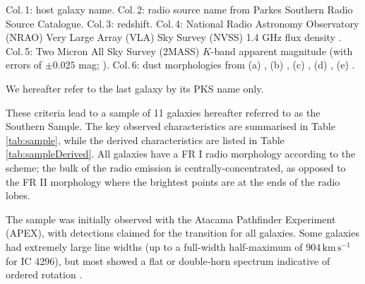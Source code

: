 \begin{table}
\begin{threeparttable}
\begin{tabular}{l l r r r l}
			\hline
		\end{tabular}
		\begin{tablenotes}
		\footnotesize
		\note Col.\,1: host galaxy name. Col.\,2: radio source name from Parkes Southern Radio Source Catalogue. Col.\,3: redshift. Col.\,4: National Radio Astronomy Observatory (NRAO) Very Large Array (VLA) Sky Survey (NVSS) 1.4 GHz flux density \citep{Condon1998}. Col.\,5: Two Micron All Sky Survey (2MASS) $K$-band apparent magnitude (with errors of $\pm 0.025$ mag; \citealt{Skrutskie2006}). Col.\,6: dust morphologies from (a) \citet{Govoni2000}, (b) \citet{Lauer2005}, (c) \citet{Bettoni2001}, (d) \citet{Sandage1979}, (e) \citet{Colbert2001}. 
		\item We hereafter refer to the last galaxy by its PKS name only.
		\end{tablenotes}
	\end{threeparttable}
	\end{table}

	These criteria lead to a sample of 11 galaxies hereafter referred to as the Southern Sample. The key observed characteristics are summarised in Table \ref{tab:sample}, while the derived characteristics are listed in Table \ref{tab:sampleDerived}. All galaxies have a FR I radio morphology according to the \citet{Fanaroff1974} scheme; the bulk of the radio emission is centrally-concentrated, as opposed to the FR II morphology where the brightest points are at the ends of the radio lobes. 
	
	The sample was initially observed with the Atacama Pathfinder Experiment (APEX), with detections claimed for the  transition for all galaxies. Some galaxies had extremely large line widths (up to a full-width half-maximum of $904 \, \mathrm{km \, s^{-1}}$ for IC 4296), but most showed a flat or double-horn spectrum indicative of ordered rotation \citep{Prandoni2012}.


